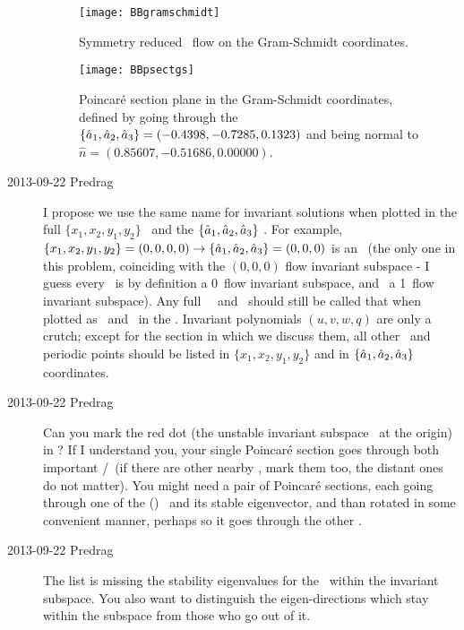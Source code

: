 \begin{description}
\begin{figure}%
  \begin{center}
  \texttt{[image: BBgramschmidt]}
  \end{center}
  \caption{
   Symmetry reduced \twomode\ flow on the Gram-Schmidt coordinates.
 }
  \label{fig:BBgramschmidt}
\end{figure}

\begin{figure}%
  \begin{center}
  \texttt{[image: BBpsectgs]}
  \end{center}
  \caption{
	Poincar\'e section plane in the Gram-Schmidt coordinates, defined by
    going through the \reqv\
	$\{\hat{a}_1,\hat{a}_2,\hat{a}_3\} = (-0.4398, -0.7285, 0.1323)$
    and being normal to $\hat{n} =  (0.85607, -0.51686, 0.00000)$.
 }
  \label{fig:BBpsectgs}
\end{figure}

\item[2013-09-22 Predrag] I propose we use the same name for invariant
solutions when plotted in the full $\{x_1,x_2,y_1,y_2\}$ \statesp\ and
the $\{\hat{a}_1,\hat{a}_2,\hat{a}_3\}$ \reducedsp. For example, $\{x_1,x_2,y_1,y_2\} = (0,0,0,0) \to
\{\hat{a}_1,\hat{a}_2,\hat{a}_3\}  = (0,0,0)$ is an \eqv\ (the only one
in this problem, coinciding with the $(0,0,0)$ flow invariant subspace - I
guess every \eqv\ is by definition a 0\dmn\ flow invariant subspace, and
\reqv\ a 1\dmn\ flow invariant subspace). Any full \statesp\ \reqv\ and \rpo\
should still be called that when plotted as \eqv\ and \po\ in the
\reducedsp. Invariant polynomials $(u,v,w,q)$ are only a crutch; except
for the section in which we discuss them, all other \reqv\ and periodic
points should be listed in $\{x_1,x_2,y_1,y_2\}$ and in
$\{\hat{a}_1,\hat{a}_2,\hat{a}_3\}$ coordinates.


\item[2013-09-22 Predrag]
Can you mark the red dot (the unstable invariant subspace \eqv\ at the
origin) in  ? If I understand you, your single
Poincar\'e section goes through both important \eqva/\reqva\ (if there
are other nearby \reqva, mark them too, the distant ones do not matter).
You might need a pair of Poincar\'e sections, each going through one of
the (\reducedsp) \eqva\ and its stable eigenvector, and than rotated in
some convenient manner, perhaps so it goes through the other \eqv.

\item[2013-09-22 Predrag]
The list  is missing the stability
eigenvalues for the \reqv\ within the invariant subspace. You also want
to distinguish the eigen-directions which stay within the subspace from
those who go out of it.


\end{description}
